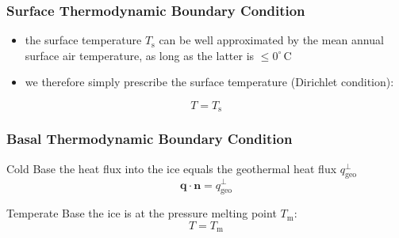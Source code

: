 \documentclass[hide notes,intlimits]{beamer}
\begin{document}
\begin{frame}
  \frametitle{Surface Thermodynamic Boundary Condition}
  \begin{itemize}
  \item the surface temperature  $T_{\text{s}}$ can be well approximated by the mean annual surface air temperature, as long as the latter is $\le
 0^{\circ}\,\text{C}$
 \item we therefore simply prescribe the surface temperature (Dirichlet condition):
 \end{itemize}
    \begin{equation*}
      T= T_{\text{s}} 
    \end{equation*}
\end{frame}


\begin{frame}
  \frametitle{Basal Thermodynamic Boundary Condition}
  \begin{block}{Cold Base}
    the heat flux into the ice equals the geothermal heat flux $q_{\text{geo}}^{\perp}$
    \begin{equation*}
      \mathbf{q} \cdot \mathbf{n} = q_{\text{geo}}^{\perp}
    \end{equation*}
  \end{block}
  \begin{block}{Temperate Base}
    the ice is at the pressure melting point $T_{\text{m}}$:
    \begin{equation*}
      T= T_{\text{m}} 
    \end{equation*}
  \end{block}
\end{frame}
\end{document}
